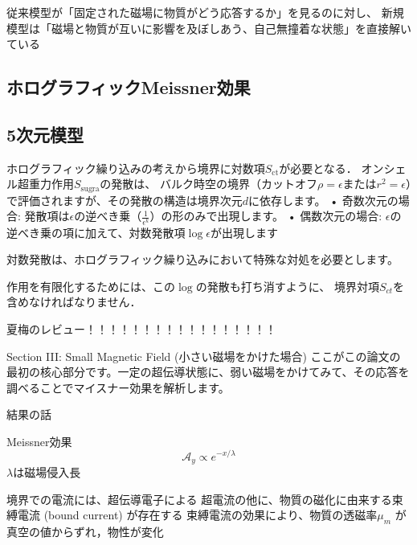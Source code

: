 \documentclass[b5paper,11pt,dvipdfmx]{jsarticle}
\numberwithin{equation}{section}
\theoremstyle{definition}
\begin{document}
従来模型が「固定された磁場に物質がどう応答するか」を見るのに対し、
新規模型は「磁場と物質が互いに影響を及ぼしあう、自己無撞着な状態」を直接解いている



\subsection{ホログラフィックMeissner効果}




\subsection{5次元模型}

ホログラフィック繰り込みの考えから境界に対数項$S_{\text{ct}}$が必要となる．
オンシェル超重力作用$S_{\text{sugra}}$の発散は、
バルク時空の境界（カットオフ$\rho = \epsilon$または$r^2 = \epsilon$）で評価されますが、その発散の構造は境界次元$d$に依存します。
• 奇数次元の場合: 発散項は$\epsilon$の逆べき乗（$\frac{1}{\epsilon^k}$）の形のみで出現します。
• 偶数次元の場合: $\epsilon$の逆べき乗の項に加えて、対数発散項$\log \epsilon$が出現します


対数発散は、ホログラフィック繰り込みにおいて特殊な対処を必要とします。

作用を有限化するためには、この$\log$の発散も打ち消すように、
境界対項$S_{ct}$を含めなければなりません\cite{deHaro00}．

















夏梅のレビュー！！！！！！！！！！！！！！！！！





Section III: Small Magnetic Field (小さい磁場をかけた場合)
ここがこの論文の最初の核心部分です。一定の超伝導状態に、弱い磁場をかけてみて、その応答を調べることでマイスナー効果を解析します。





結果の話

Meissner効果
\begin{equation}
    \mathcal{A}_{y}\propto e^{-x/\lambda}
\end{equation}
$\lambda$は磁場侵入長

境界での電流には、超伝導電子による
超電流の他に、物質の磁化に由来する束縛電流 (bound current) が存在する
束縛電流の効果により、物質の透磁率$\mu_m$ が真空の値からずれ，物性が変化
\end{document}
